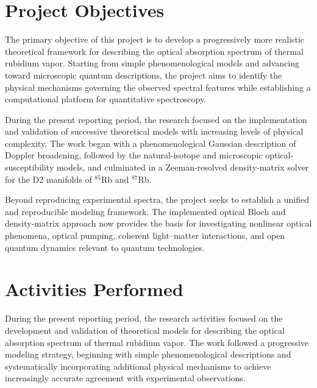 \documentclass[11pt]{article}
\numberwithin{equation}{section}
\begin{document}
\section{Project Objectives}

The primary objective of this project is to develop a progressively more realistic theoretical framework for describing the optical absorption spectrum of thermal rubidium vapor. Starting from simple phenomenological models and advancing toward microscopic quantum descriptions, the project aims to identify the physical mechanisms governing the observed spectral features while establishing a computational platform for quantitative spectroscopy.

During the present reporting period, the research focused on the implementation and validation of successive theoretical models with increasing levels of physical complexity. The work began with a phenomenological Gaussian description of Doppler broadening, followed by the natural-isotope and microscopic optical-susceptibility models, and culminated in a Zeeman-resolved density-matrix solver for the D2 manifolds of \(^{85}\mathrm{Rb}\) and \(^{87}\mathrm{Rb}\).

Beyond reproducing experimental spectra, the project seeks to establish a unified and reproducible modeling framework. The implemented optical Bloch and density-matrix approach now provides the basis for investigating nonlinear optical phenomena, optical pumping, coherent light--matter interactions, and open quantum dynamics relevant to quantum technologies.

\section{Activities Performed}

During the present reporting period, the research activities focused on the development and validation of theoretical models for describing the optical absorption spectrum of thermal rubidium vapor. The work followed a progressive modeling strategy, beginning with simple phenomenological descriptions and systematically incorporating additional physical mechanisms to achieve increasingly accurate agreement with experimental observations.
\end{document}

